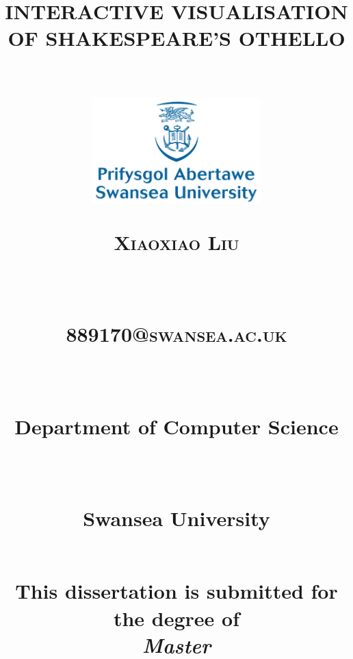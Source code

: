 
\newcommand{\horrule}[1]{\rule{\linewidth}{#1}} %
\title{
\begin{Huge}\textbf{INTERACTIVE VISUALISATION OF SHAKESPEARE'S OTHELLO} \end{Huge} \\%
\vspace{70px}
\includegraphics[width = 65mm]{Figs/SwanseaUniversity}\\[8ex]
\begin{large} \textsc{\textbf{Xiaoxiao Liu}} \end{large} \\ %
\begin{large} \textsc{\textbf{889170@swansea.ac.uk}} \end{large} \\ %
\vspace{10px}
\normalfont \normalsize 
\begin{normalsize}Department of Computer Science \end{normalsize}\\  %
\begin{normalsize} Swansea University \end{normalsize} \\ %
\vspace{60px}
This dissertation is submitted for the degree of\\
\textit{Master}
\vspace{20px}
}
\author{} %
\date{} %

